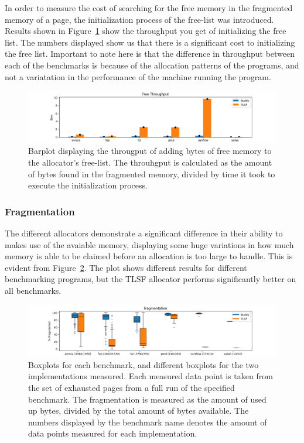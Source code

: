 In order to measure the cost of searching for the free memory in the fragmented memory of a page, the initialization process of the free-list was introduced. Results shown in Figure~\ref{fig:free-list-initialization} show the throughput you get of initializing the free list. The numbers displayed show us that there is a significant cost to initializing the free list. Important to note here is that the difference in throughput between each of the benchmarks is because of the allocation patterns of the programs, and not a variatation in the performance of the machine running the program. 

\begin{figure}[H]
\centering
\includegraphics[width=1\textwidth]{figures/free_throughput.png}
\caption{Barplot displaying the througput of adding bytes of free memory to the allocator's free-list. The throuhgput is calculated as the amount of bytes found in the fragmented memory, divided by time it took to execute the initialization process.}
\label{fig:free-list-initialization}
\end{figure}

\subsubsection{Fragmentation}
\label{sec:results:frag}
The different allocators demonstrate a significant difference in their ability to makes use of the avaiable memory, displaying some huge variations in how much memory is able to be claimed before an allocation is too large to handle. This is evident from Figure~\ref*{fig:memory-fragmentation}. The plot shows different results for different benchmarking programs, but the TLSF allocator performs significantly better on all benchmarks.

\begin{figure}[H]
\centering
\includegraphics[width=1\textwidth]{figures/fl_fragmentation.png}
\caption{Boxplots for each benchmark, and different boxplots for the two implementations measured. Each measured data point is taken from the set of exhausted pages from a full run of the specified benchmark. The fragmentation is measured as the amount of used up bytes, divided by the total amount of bytes available. The numbers displayed by the benchmark name denotes the amount of data points measured for each implementation.}
\label{fig:memory-fragmentation}
\end{figure}

